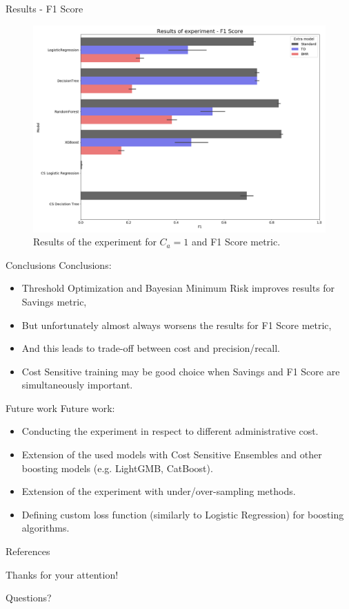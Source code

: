 \documentclass[10pt]{beamer}
\begin{document}
\begin{frame}{Results - F1 Score}
    \begin{figure}
        \centering
        \includegraphics[width=0.9\linewidth,keepaspectratio]{Config1-F1.png}
        \caption{Results of the experiment for $C_a = 1$ and F1 Score metric.}
    \end{figure}
\end{frame}

\begin{frame}{Conclusions}
    Conclusions:
    \begin{itemize}
        \item Threshold Optimization and Bayesian Minimum Risk improves results for Savings metric, \pause
        \item But unfortunately almost always worsens the results for F1 Score metric, \pause
        \item And this leads to trade-off between cost and precision/recall. \pause
        \item Cost Sensitive training may be good choice when Savings and F1 Score are simultaneously important.
    \end{itemize}{}
\end{frame}{}

\begin{frame}{Future work}
    Future work:
    \begin{itemize}
        \item Conducting the experiment in respect to different administrative cost.
        \item Extension of the used models with Cost Sensitive Ensembles and other boosting models (e.g. LightGMB, CatBoost).
        \item Extension of the experiment with under/over-sampling methods.
        \item Defining custom loss function (similarly to Logistic Regression) for boosting algorithms.
    \end{itemize}{}
\end{frame}{}

\begin{frame}[allowframebreaks]{References}

  
  

\end{frame}

{
\begin{frame}
    \centering
    {\Large Thanks for your attention!}
    
    \bigskip
    
    Questions?
\end{frame}
}
\end{document}
